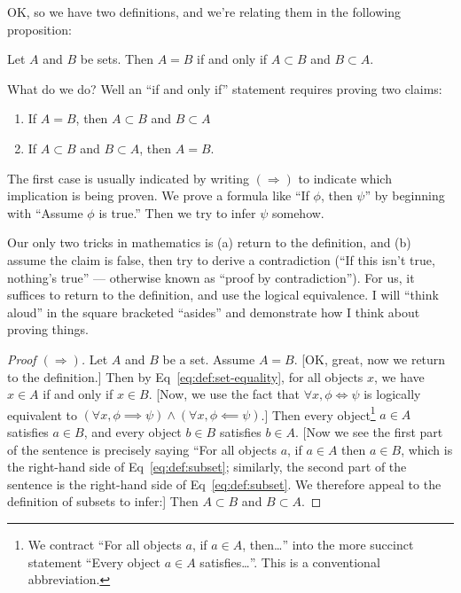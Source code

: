 OK, so we have two definitions, and we're relating them in the following
proposition:

\begin{proposition}\label{prop:subsets:equiv-set-equality}
Let $A$ and $B$ be sets.
Then $A=B$ if and only if $A\subset B$ and $B\subset A$.
\end{proposition}

What do we do? Well an ``if and only if'' statement requires proving two
claims:
\begin{enumerate}
\item If $A=B$, then $A\subset B$ and $B\subset A$
\item If $A\subset B$ and $B\subset A$, then $A=B$.
\end{enumerate}
The first case is usually indicated by writing $(\Longrightarrow)$ to
indicate which implication is being proven. We prove a formula like ``If
$\phi$, then $\psi$'' by beginning with ``Assume $\phi$ is true.'' Then
we try to infer $\psi$ somehow.

Our only two tricks in mathematics is (a) return to the definition, and
(b) assume the claim is false, then try to derive a contradiction (``If
this isn't true, nothing's true'' --- otherwise known as ``proof by
contradiction''). For us, it suffices to return to the definition, and
use the logical equivalence. I will ``think aloud'' in the square
bracketed ``asides'' and demonstrate how I think about proving things.

\begin{proof}[Proof $(\Longrightarrow)$]
Let $A$ and $B$ be a set. Assume $A=B$. [OK, great, now we return to the
definition.] Then by Eq~\eqref{eq:def:set-equality}, for all objects
$x$, we have $x\in A$ if and only if $x\in B$. [Now, we use the fact
that $\forall x,\phi\iff\psi$ is logically equivalent to
$(\forall x,\phi\implies\psi)\land(\forall x,\phi\impliedby\psi)$.]
Then every object\footnote{We contract ``For all objects $a$, if $a\in A$, then\dots''
into the more succinct statement ``Every object $a\in A$ satisfies\dots''.
This is a conventional abbreviation.}
$a\in A$ satisfies $a\in B$, and every object $b\in B$
satisfies $b\in A$. [Now we see the first part of the sentence is
  precisely saying ``For all objects $a$, if $a\in A$ then $a\in B$, 
which is the right-hand side of Eq~\eqref{eq:def:subset}; similarly, the
second part of the sentence is the right-hand side of
Eq~\eqref{eq:def:subset}. We therefore appeal to the definition of
subsets to infer:]
Then $A\subset B$ and $B\subset A$.
\end{proof}

